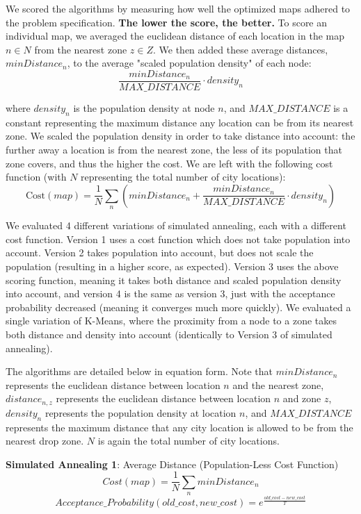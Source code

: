 \documentclass[11pt]{article}
\begin{document}
We scored the algorithms by measuring how well the optimized maps adhered to the problem specification. \textbf{The lower the score, the better.} To score an individual map, we averaged the euclidean distance of each location in the map $n \in N$ from the nearest zone $z \in Z$. We then added these average distances, $minDistance_n$, to the average "scaled population density" of each node: 
$$\frac{minDistance_n}{MAX\_DISTANCE} \cdot density_n$$

where $density_n$ is the population density at node $n$, and $MAX\_DISTANCE$ is a constant representing the maximum distance any location can be from its nearest zone. We scaled the population density in order to take distance into account: the further away a location is from the nearest zone, the less of its population that zone covers, and thus the higher the cost. 
We are left with the following cost function (with $N$ representing the total number of city locations):
$$\text{Cost}(map) = \frac{1}{N}\sum_n \left(minDistance_n + \frac{minDistance_n}{MAX\_DISTANCE} \cdot density_n \right)$$


We evaluated 4 different variations of simulated annealing, each with a different cost function. Version 1 uses a cost function which does not take population into account. Version 2 takes population into account, but does not scale the population (resulting in a higher score, as expected). Version 3 uses the above scoring function, meaning it takes both distance and scaled population density into account, and version 4 is the same as version 3, just with the acceptance probability decreased (meaning it converges much more quickly). We evaluated a single variation of K-Means, where the proximity from a node to a zone takes both distance and density into account (identically to Version 3 of simulated annealing).

The algorithms are detailed below in equation form. Note that $minDistance_n$ represents the euclidean distance between location $n$ and the nearest zone, $distance_{n,z}$ represents the euclidean distance between location $n$ and zone $z$, $density_n$ represents the population density at location $n$, and $MAX\_DISTANCE$ represents the maximum distance that any city location is allowed to be from the nearest drop zone. $N$ is again the total number of city locations.
\newline

\noindent\textbf{Simulated Annealing 1}: Average Distance (Population-Less Cost Function)
$$Cost(map) = \frac{1}{N}\sum_n minDistance_n$$
$$Acceptance\_Probability(old\_cost, new\_cost) = e^{\frac{old\_cost - new\_cost}{T}}$$
\newline
\end{document}

